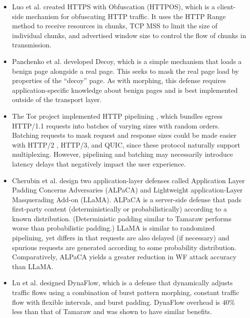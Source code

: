 \documentclass[runningheads]{llncs}
\begin{document}
\begin{itemize}
\item Luo et al. \cite{luo2011httpos} created HTTPS with Obfuscation (HTTPOS), which is a client-side
mechanism for obfuscating HTTP traffic. It uses the HTTP Range method to receive resources in chunks, TCP
MSS to limit the size of individual chunks, and advertised window size to control the flow of chunks
in transmission.

\item Panchenko et al. \cite{panchenko2011website} developed Decoy, which is a simple mechanism that loads
a benign page alongside a real page. This seeks to mask the real page load by properties of the ``decoy'' page.
As with morphing, this defense requires application-specific knowledge about benign pages and is best
implemented outside of the transport layer.

\item The Tor project implemented HTTP pipelining \cite{perry2011experimental}, which bundles egress HTTP/1.1
requests into batches of varying sizes with random orders. Batching requests to mask request and response sizes
could be made easier with HTTP/2 \cite{rfc7540}, HTTP/3, and QUIC, since these protocol naturally support
multiplexing. However, pipelining and batching may necessarily introduce latency delays that negatively impact
the user experience.

\item Cherubin et al. \cite{cherubin2017website} design two application-layer defenses called Application
Layer Padding Concerns Adversaries (ALPaCA) and Lightweight application-Layer Masquerading Add-on (LLaMA).
ALPaCA is a server-side defense that pads first-party content (deterministically or probabilistically)
according to a known distribution. (Deterministic padding similar to Tamaraw performs worse than
probabilistic padding.) LLaMA is similar to randomized pipelining, yet differs in that requests are also
delayed (if necessary) and spurious requests are generated according to some probability distribution.
Comparatively, ALPaCA yields a greater reduction in WF attack accuracy than LLaMA.

\item Lu et al. \cite{lu2018dynaflow} designed DynaFlow, which is a defense that dynamically adjusts
traffic flows using a combination of burst pattern morphing, constant traffic flow with flexible
intervals, and burst padding. DynaFlow overhead is $40$\% less than that of Tamaraw and was shown
to have similar benefits.

\end{itemize}
%
\end{document}
